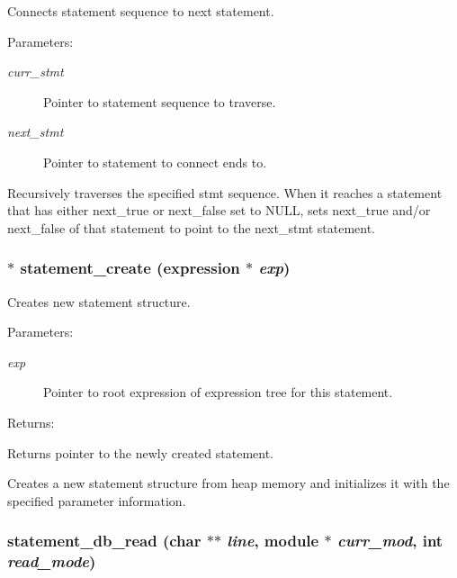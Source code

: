 Connects statement sequence to next statement.

\begin{Desc}
\item[Parameters: ]\par
\begin{description}
\item[{\em 
curr\_\-stmt}]Pointer to statement sequence to traverse. \item[{\em 
next\_\-stmt}]Pointer to statement to connect ends to.\end{description}
\end{Desc}
Recursively traverses the specified stmt sequence. When it reaches a statement  that has either next\_\-true or next\_\-false set to NULL, sets next\_\-true and/or  next\_\-false of that statement to point to the next\_\-stmt statement. 
\subsubsection{$\ast$ statement\_\-create ({\bf expression} $\ast$ {\em exp})}\label{statement_8c_a2}


Creates new statement structure.

\begin{Desc}
\item[Parameters: ]\par
\begin{description}
\item[{\em 
exp}]Pointer to root expression of expression tree for this statement.\end{description}
\end{Desc}
\begin{Desc}
\item[Returns: ]\par
Returns pointer to the newly created statement.\end{Desc}
Creates a new statement structure from heap memory and initializes it with the specified parameter information. 
\subsubsection{ statement\_\-db\_\-read (char $\ast$$\ast$ {\em line}, {\bf module} $\ast$ {\em curr\_\-mod}, int {\em read\_\-mode})}\label{statement_8c_a6}


